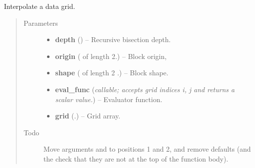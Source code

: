 \documentclass[letterpaper,10pt,english]{sphinxmanual}
\begin{document}

\begin{fulllineitems}
\label{docs/utilities:blrb.interpolate_grid}
Interpolate a data grid.
\begin{quote}\begin{description}
\item[{Parameters}] \leavevmode\begin{itemize}
\item {} 
\textbf{depth} () -- Recursive bisection depth.

\item {} 
\textbf{origin} ( of length 2.) -- Block origin,

\item {} 
\textbf{shape} ( of length 2 .) -- Block shape.

\item {} 
\textbf{eval\_func} (\emph{callable; accepts grid indices i, j and returns a scalar value.}) -- Evaluator function.

\item {} 
\textbf{grid} (.) -- Grid array.

\end{itemize}

\item[{Todo }] \leavevmode
Move arguments  and  to positions 1 and 2, and
remove defaults (and the check that they are not  at the top
of the function body).

\end{description}\end{quote}

\end{fulllineitems}


\end{document}

